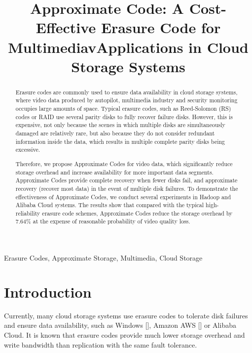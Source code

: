 \documentclass[conference]{IEEEtran}
\begin{document}
\title{\LARGE{Approximate Code: A Cost-Effective Erasure Code for MultimediavApplications in Cloud Storage Systems}\\
}
\author{
}

\maketitle

\begin{abstract}
Erasure codes are commonly used to ensure data availability in cloud storage systems, where video data produced by autopilot, multimedia industry and security monitoring occupies large amounts of space. 
Typical erasure codes, such as Reed-Solomon (RS) codes or RAID use several parity disks to fully recover failure disks. 
However, this is expensive, not only because the scenes in which multiple disks are simultaneously damaged are relatively rare, but also because they do not consider redundant information inside the data, which results in multiple complete parity disks being excessive.   

Therefore, we propose Approximate Codes for video data, which significantly reduce storage overhead and increase availability for more important data segments.
Approximate Codes provide complete recovery when fewer disks fail, and approximate recovery (recover most data) in the event of multiple disk failures.
To demonstrate the effectiveness of Approximate Codes, we conduct several experiments in Hadoop and Alibaba Cloud systems.
The results show that compared with the typical high-reliability erasure code schemes, Approximate Codes reduce the storage overhead by 7.64\% at the expense of reasonable probability of video quality loss.

\end{abstract}

\begin{IEEEkeywords}
    Erasure Codes, Approximate Storage, Multimedia, Cloud Storage
\end{IEEEkeywords}

\section{Introduction}
Currently, many cloud storage systems use erasure codes to tolerate disk failures and ensure data availability, such as Windows [], Amazon AWS [] or Alibaba Cloud. It is known that erasure codes provide much lower storage overhead and write bandwidth than replication with the same fault tolerance.
\end{document}
